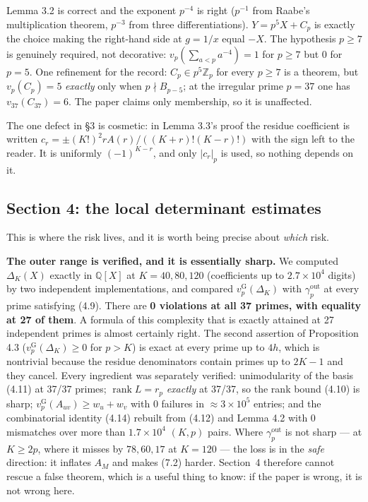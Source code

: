 \documentclass[11pt]{article}
\theoremstyle{definition}
\newcommand{\vG}{v_p^{\mathrm{G}}}
\newcommand{\gout}{\gamma_p^{\mathrm{out}}}
\begin{document}
Lemma 3.2 is correct and the exponent $p^{-4}$ is right ($p^{-1}$ from Raabe's multiplication
theorem, $p^{-3}$ from three differentiations). $Y=p^5X+C_p$ is exactly the choice making the
right-hand side at $g=1/x$ equal $-X$. The hypothesis $p\ge7$ is genuinely required, not
decorative: $v_p(\sum_{a<p}a^{-4})=1$ for $p\ge7$ but $0$ for $p=5$. One refinement for the
record: $C_p\in p^5\mathbb{Z}_p$ for every $p\ge7$ is a theorem, but $v_p(C_p)=5$ \emph{exactly}
only when $p\nmid B_{p-5}$; at the irregular prime $p=37$ one has $v_{37}(C_{37})=6$. The paper
claims only membership, so it is unaffected.

The one defect in \S3 is cosmetic: in Lemma 3.3's proof the residue coefficient is written
$c_r=\pm(K!)^2rA(r)/((K+r)!(K-r)!)$ with the sign left to the reader. It is uniformly
$(-1)^{K-r}$, and only $|c_r|_p$ is used, so nothing depends on it.

\subsection{Section 4: the local determinant estimates}

This is where the risk lives, and it is worth being precise about \emph{which} risk.

\textbf{The outer range is verified, and it is essentially sharp.} We computed $\Delta_K(X)$
exactly in $\mathbb{Q}[X]$ at $K=40,80,120$ (coefficients up to $2.7\times10^4$ digits) by two
independent implementations, and compared $\vG(\Delta_K)$ with $\gout$ at every prime satisfying
(4.9). There are \textbf{0 violations at all 37 primes, with equality at 27 of them}. A formula
of this complexity that is exactly attained at 27 independent primes is almost certainly right.
The second assertion of Proposition 4.3 ($\vG(\Delta_K)\ge0$ for $p>K$) is exact at every prime
up to $4h$, which is nontrivial because the residue denominators contain primes up to $2K-1$
and they cancel. Every ingredient was separately verified: unimodularity of the basis (4.11)
at 37/37 primes; $\operatorname{rank}L=r_p$ \emph{exactly} at 37/37, so the rank bound (4.10) is
sharp; $\vG(A_{uv})\ge w_u+w_v$ with 0 failures in $\approx3\times10^5$ entries; and the
combinatorial identity (4.14) rebuilt from (4.12) and Lemma 4.2 with 0 mismatches over more than
$1.7\times10^4$ $(K,p)$ pairs. Where $\gout$ is not sharp --- at $K\ge2p$, where it misses by
$78,60,17$ at $K=120$ --- the loss is in the \emph{safe} direction: it inflates $A_M$ and makes
(7.2) harder. Section~4 therefore cannot rescue a false theorem, which is a useful thing to
know: if the paper is wrong, it is not wrong here.
\end{document}
